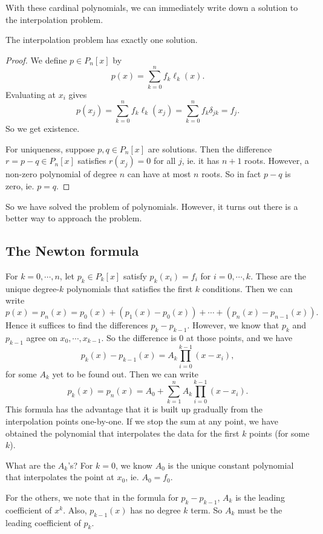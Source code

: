 \documentclass[a4paper]{article}
\begin{document}
With these cardinal polynomials, we can immediately write down a solution to the interpolation problem.
\begin{thm}
  The interpolation problem has exactly one solution.
\end{thm}

\begin{proof}
  We define $p \in P_n[x]$ by
  \[
    p(x) = \sum_{k = 0}^n f_k \ell_k (x).
  \]
  Evaluating at $x_i$ gives
  \[
    p(x_j) = \sum_{k = 0}^n f_k \ell_k(x_j) = \sum_{k = 0}^n f_k \delta_{jk} = f_j.
  \]
  So we get existence.

  For uniqueness, suppose $p, q \in P_n[x]$ are solutions. Then the difference $r = p - q \in P_n[x]$ satisfies $r(x_j) = 0$ for all $j$, ie. it has $n + 1$ roots. However, a non-zero polynomial of degree $n$ can have at most $n$ roots. So in fact $p - q$ is zero, ie. $p = q$.
\end{proof}
So we have solved the problem of polynomials. However, it turns out there is a better way to approach the problem.

\subsection{The Newton formula}
For $k = 0, \cdots, n$, let $p_k \in P_k[x]$ satisfy $p_k(x_i) = f_i$ for $i = 0, \cdots, k$. These are the unique degree-$k$ polynomials that satisfies the first $k$ conditions. Then we can write
\[
  p(x) = p_n(x) = p_0(x) + (p_1(x) - p_0(x)) + \cdots + (p_n(x) - p_{n - 1}(x)).
\]
Hence it suffices to find the differences $p_k - p_{k - 1}$. However, we know that $p_k$ and $p_{k - 1}$ agree on $x_0, \cdots, x_{k - 1}$. So the difference is $0$ at those points, and we have
\[
  p_k(x) - p_{k - 1}(x) = A_k \prod_{i = 0}^{k - 1}(x - x_i),
\]
for some $A_k$ yet to be found out. Then we can write
\[
  p_k(x) = p_n(x) = A_0 + \sum_{k = 1}^n A_k \prod_{i = 0}^{k - 1} (x - x_i).
\]
This formula has the advantage that it is built up gradually from the interpolation points one-by-one. If we stop the sum at any point, we have obtained the polynomial that interpolates the data for the first $k$ points (for some $k$).

What are the $A_k$'s? For $k = 0$, we know $A_0$ is the unique constant polynomial that interpolates the point at $x_0$, ie. $A_0 = f_0$.

For the others, we note that in the formula for $p_k - p_{k - 1}$, $A_k$ is the leading coefficient of $x^k$. Also, $p_{k - 1}(x)$ has no degree $k$ term. So $A_k$ must be the leading coefficient of $p_k$.
\end{document}

